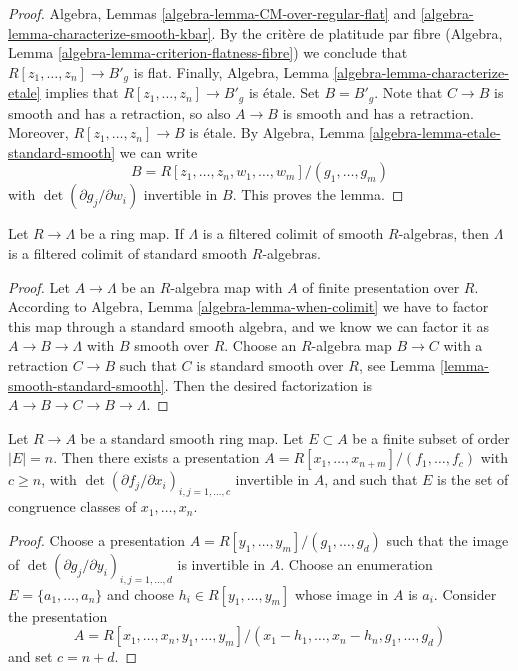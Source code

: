 \begin{proof}
Algebra, Lemmas \ref{algebra-lemma-CM-over-regular-flat} and
\ref{algebra-lemma-characterize-smooth-kbar}. By the crit\`ere
de platitude par fibre
(Algebra, Lemma \ref{algebra-lemma-criterion-flatness-fibre})
we conclude that $R[z_1, \ldots, z_n] \to B'_g$ is flat.
Finally, Algebra, Lemma \ref{algebra-lemma-characterize-etale}
implies that $R[z_1, \ldots, z_n] \to B'_g$ is \'etale.
Set $B = B'_g$. Note that $C \to B$ is smooth and has a retraction,
so also $A \to B$ is smooth and has a retraction.
Moreover, $R[z_1, \ldots, z_n] \to B$ is \'etale.
By Algebra, Lemma \ref{algebra-lemma-etale-standard-smooth}
we can write
$$
B = R[z_1, \ldots, z_n, w_1, \ldots, w_m]/(g_1, \ldots, g_m)
$$
with $\det(\partial g_j/\partial w_i)$ invertible in $B$.
This proves the lemma.
\end{proof}

\begin{lemma}
\label{lemma-colimit-standard-smooth}
Let $R \to \Lambda$ be a ring map. If $\Lambda$ is a filtered colimit of
smooth $R$-algebras, then $\Lambda$ is a filtered colimit of standard
smooth $R$-algebras.
\end{lemma}

\begin{proof}
Let $A \to \Lambda$ be an $R$-algebra map with $A$
of finite presentation over $R$. According to
Algebra, Lemma \ref{algebra-lemma-when-colimit}
we have to factor this map through a standard smooth algebra, and
we know we can factor it as $A \to B \to \Lambda$ with $B$ smooth
over $R$. Choose an $R$-algebra map $B \to C$ with a retraction
$C \to B$ such that $C$ is standard smooth over $R$, see
Lemma \ref{lemma-smooth-standard-smooth}.
Then the desired factorization is $A \to B \to C \to B \to \Lambda$.
\end{proof}

\begin{lemma}
\label{lemma-standard-smooth-include-generators}
Let $R \to A$ be a standard smooth ring map.
Let $E \subset A$ be a finite subset of order $|E| = n$.
Then there exists a presentation
$A = R[x_1, \ldots, x_{n + m}]/(f_1, \ldots, f_c)$ with $c \geq n$,
with $\det(\partial f_j/\partial x_i)_{i, j = 1, \ldots, c}$
invertible in $A$, and such that $E$ is the set of congruence classes of
$x_1, \ldots, x_n$.
\end{lemma}

\begin{proof}
Choose a presentation $A = R[y_1, \ldots, y_m]/(g_1, \ldots, g_d)$
such that the image of
$\det(\partial g_j/\partial y_i)_{i, j = 1, \ldots, d}$
is invertible in $A$. Choose an enumeration $E = \{a_1, \ldots, a_n\}$
and choose $h_i \in R[y_1, \ldots, y_m]$ whose image in $A$ is $a_i$.
Consider the presentation
$$
A = R[x_1, \ldots, x_n, y_1, \ldots, y_m]/
(x_1 - h_1, \ldots, x_n - h_n, g_1, \ldots, g_d)
$$
and set $c = n + d$.
\end{proof}

